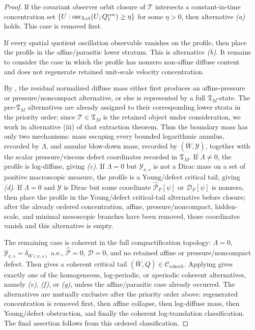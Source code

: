 \documentclass[11pt]{amsart}
\numberwithin{equation}{section}
\theoremstyle{plain}
\theoremstyle{definition}
\theoremstyle{remark}
\newcommand{\Ccohcrit}{\mathcal C_{\mathrm{cohcrit}}}
\newcommand{\Tcrit}{\mathfrak T_M}
\newcommand{\actthree}{\operatorname{osc}_{3,\mathrm{ct}}}
\begin{document}
\begin{proof}
If the covariant observer orbit closure of \(\mathcal T\) intersects a
constant-in-time concentration set \(\{U:\actthree(U;Q_1^{\rm cov})\ge
\eta\}\) for some \(\eta>0\), then alternative \emph{(a)} holds.  This case is
removed first.

If every spatial quotient oscillation observable vanishes on the profile, then
place the profile in the affine/parasitic lower stratum.  This is alternative
\emph{(b)}.  It remains to consider the case in which the profile has nonzero
non-affine diffuse content and does not regenerate retained unit-scale velocity
concentration.

By , the residual normalized
diffuse mass either first produces an affine-pressure or pressure/noncompact
alternative, or else is represented by a full \(\Tcrit\)-state.  The
pre-\(\Tcrit\) alternatives are already assigned to their corresponding lower
strata in the priority order; since \(\mathcal T\in\Tcrit\) is the retained
object under consideration, we work in alternative
\textup{(iii)} of that extraction theorem.  Thus the
boundary mass has only two mechanisms: mass escaping every bounded logarithmic
annulus, recorded by \(\Lambda\), and annular blow-down mass, recorded by
\((\bar W,\mathcal Y)\), together with the scalar pressure/viscous defect
coordinates recorded in \(\Tcrit\).  If \(\Lambda\ne0\), the profile is log-diffuse, giving
\emph{(c)}.  If \(\Lambda=0\) but \(\mathcal Y_{x,s}\) is not a Dirac mass on a
set of positive macroscopic measure, the profile is a Young/defect critical tail, giving
\emph{(d)}.  If \(\Lambda=0\) and \(\mathcal Y\) is Dirac but some coordinate
\(\widehat{\mathscr P}_F[\psi]\) or \(\mathscr D_F[\psi]\) is nonzero, then
place the profile in the Young/defect critical-tail alternative before closure;
after the already ordered concentration, affine, pressure/noncompact,
hidden-scale, and minimal mesoscopic branches have been removed, those
coordinates vanish and this alternative is empty.

The remaining case is coherent in the full compactification topology:
\(\Lambda=0\),
\(\mathcal Y_{x,s}=\delta_{\bar W(x,s)}\) a.e.,
\(\widehat{\mathscr P}=0\), \(\mathscr D=0\), and no retained affine or
pressure/noncompact defect.  Then
 gives a coherent critical tail
\((\bar W,Q)\in\Ccohcrit\).  Applying
 gives exactly one of the
homogeneous, log-periodic, or aperiodic coherent alternatives, namely
\emph{(e)}, \emph{(f)}, or \emph{(g)}, unless the affine/parasitic case already
occurred.  The alternatives are mutually exclusive after the priority order
above: regenerated concentration is removed first, then affine collapse, then
log-diffuse mass, then Young/defect obstruction, and finally the coherent
log-translation classification.  The final assertion follows from this ordered
classification.
\end{proof}
\end{document}
